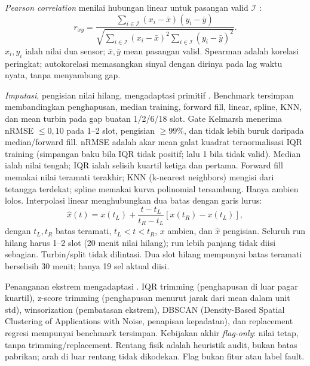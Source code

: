 \textit{Pearson correlation} menilai hubungan linear untuk pasangan valid $\mathcal I$ \cite{bette2023,bonifati2022}:
\begin{equation}
r_{xy}=\frac{\sum_{i\in\mathcal I}(x_i-\bar x)(y_i-\bar y)}{\sqrt{\sum_{i\in\mathcal I}(x_i-\bar x)^2\sum_{i\in\mathcal I}(y_i-\bar y)^2}}.
\label{eq:pearson}
\end{equation}
$x_i,y_i$ ialah nilai dua sensor; $\bar x,\bar y$ mean pasangan valid. Spearman adalah korelasi peringkat; autokorelasi memasangkan sinyal dengan dirinya pada lag waktu nyata, tanpa menyambung gap.

\textit{Imputasi}, pengisian nilai hilang, mengadaptasi primitif \cite{bonifati2022,cai2025,ghaderi2023}. Benchmark tersimpan membandingkan penghapusan, median training, forward fill, linear, spline, KNN, dan mean turbin pada gap buatan 1/2/6/18 slot. Gate Kelmarsh menerima nRMSE $\leq0,10$ pada 1--2 slot, pengisian $\geq99\%$, dan tidak lebih buruk daripada median/forward fill. nRMSE adalah akar mean galat kuadrat ternormalisasi IQR training (simpangan baku bila IQR tidak positif; lalu 1 bila tidak valid). Median ialah nilai tengah; IQR ialah selisih kuartil ketiga dan pertama. Forward fill memakai nilai teramati terakhir; KNN (k-nearest neighbors) mengisi dari tetangga terdekat; spline memakai kurva polinomial tersambung. Hanya ambien lolos. Interpolasi linear menghubungkan dua batas dengan garis lurus:
\begin{equation}
\hat x(t)=x(t_L)+\frac{t-t_L}{t_R-t_L}[x(t_R)-x(t_L)],
\label{eq:linear}
\end{equation}
dengan $t_L,t_R$ batas teramati, $t_L<t<t_R$, $x$ ambien, dan $\hat x$ pengisian. Seluruh run hilang harus 1--2 slot (20 menit nilai hilang); run lebih panjang tidak diisi sebagian. Turbin/split tidak dilintasi. Dua slot hilang mempunyai batas teramati berselisih 30 menit; hanya 19 sel aktual diisi.

Penanganan ekstrem mengadaptasi \cite{ngophan2025,cai2025,li2026,belhadj2026}. IQR trimming (penghapusan di luar pagar kuartil), z-score trimming (penghapusan menurut jarak dari mean dalam unit std), winsorization (pembatasan ekstrem), DBSCAN (Density-Based Spatial Clustering of Applications with Noise, penapisan kepadatan), dan replacement regresi mempunyai benchmark tersimpan. Kebijakan akhir \textit{flag-only}: nilai tetap, tanpa trimming/replacement. Rentang fisik adalah heuristik audit, bukan batas pabrikan; arah di luar rentang tidak dikodekan. Flag bukan fitur atau label fault.

